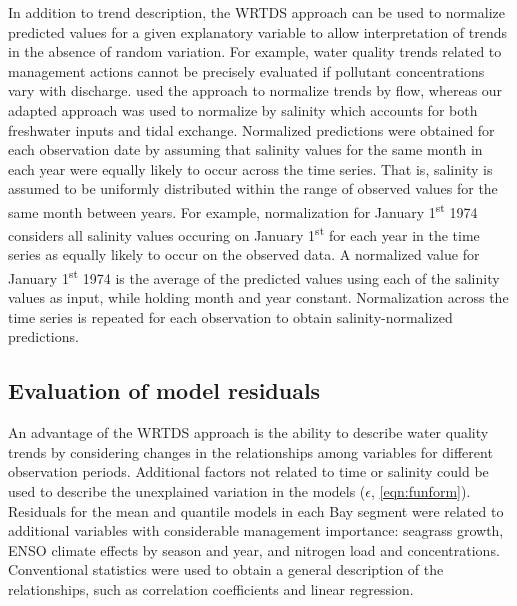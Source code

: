 \documentclass[letterpaper,12pt,oneside]{article}\usepackage{graphicx, color}
\begin{document}
In addition to trend description, the \ac{WRTDS} approach can be used to normalize predicted values for a given explanatory variable to allow interpretation of trends in the absence of random variation.  For example, water quality trends related to management actions cannot be precisely evaluated if pollutant concentrations vary with discharge.  \citet{Hirsch10} used the approach to normalize trends by flow, whereas our adapted approach was used to normalize by salinity which accounts for both freshwater inputs and tidal exchange.  Normalized predictions were obtained for each observation date by assuming that salinity values for the same month in each year were equally likely to occur across the time series.  That is, salinity is assumed to be uniformly distributed within the range of observed values for the same month between years.  For example, normalization for January 1\textsuperscript{st} 1974 considers all salinity values occuring on January 1\textsuperscript{st} for each year in the time series as equally likely to occur on the observed data.  A normalized value for January 1\textsuperscript{st} 1974 is the average of the predicted values using each of the salinity values as input, while holding month and year constant.  Normalization across the time series is repeated for each observation to obtain salinity-normalized predictions.    

\subsection{Evaluation of model residuals}

An advantage of the \ac{WRTDS} approach is the ability to describe water quality trends by considering changes in the relationships among variables for  different observation periods.  Additional factors not related to time or salinity could be used to describe the unexplained variation in the models ($\epsilon$, \cref{eqn:funform}). Residuals for the mean and quantile models in each Bay segment were related to additional variables with considerable management importance: seagrass growth, \ac{ENSO} climate effects by season and year, and nitrogen load and concentrations.  Conventional statistics were used to obtain a general description of the relationships, such as correlation coefficients and linear regression.
\end{document}
